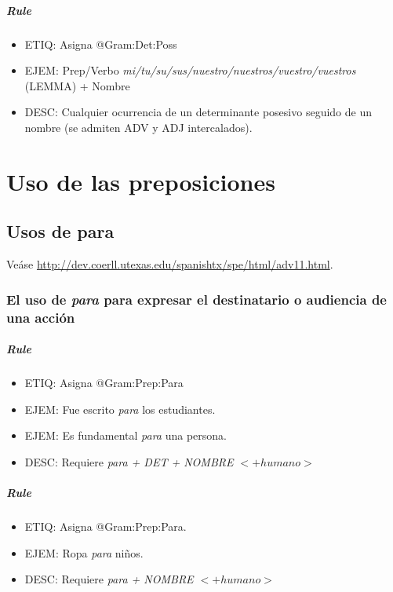 \documentclass[11pt]{report}
\begin{document}
\paragraph*{Rule}
\begin{itemize}
\item ETIQ: Asigna @Gram:Det:Poss
\item EJEM: Prep/Verbo \emph{mi/tu/su/sus/nuestro/nuestros/vuestro/vuestros} (LEMMA) + Nombre
\item DESC: Cualquier ocurrencia de un determinante posesivo seguido de un nombre (se admiten ADV y ADJ intercalados).
\end{itemize}

\chapter{Uso de las preposiciones}
\section{Usos de para}
Veáse \url{http://dev.coerll.utexas.edu/spanishtx/spe/html/adv11.html}.

\subsection{El uso de \emph{para} para expresar el destinatario o audiencia de una acción}
\paragraph*{Rule}
\begin{itemize}
\item ETIQ: Asigna @Gram:Prep:Para
\item EJEM: Fue escrito \emph{para} los estudiantes.
\item EJEM: Es fundamental \emph{para} una persona.
\item DESC: Requiere \emph{para + DET + NOMBRE $<+humano>$}
\end{itemize}

\paragraph*{Rule}
\begin{itemize}
\item ETIQ: Asigna @Gram:Prep:Para.
\item EJEM: Ropa \emph{para} niños.
\item DESC: Requiere \emph{para + NOMBRE $<+humano>$}
\end{itemize}
\end{document}
